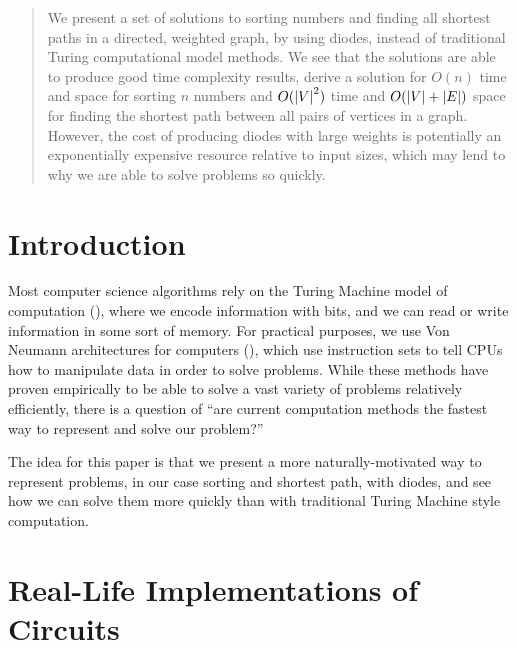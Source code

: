\documentclass{article}
\begin{document}
\maketitle

\begin{abstract}
  We present a set of solutions to sorting numbers and finding all shortest paths in a directed, weighted graph, by using diodes, instead of traditional Turing computational model methods.
  We see that the solutions are able to produce good time complexity results,
  derive a solution for $O(n)$ time and space for sorting $n$ numbers and $O(\abs{V}^2)$ time and $O(\abs{V} + \abs{E})$ space for finding the shortest path between all pairs of vertices in a graph.
  However, the cost of producing diodes with large weights is potentially an exponentially expensive resource relative to input sizes, which may lend to why we are able to solve problems so quickly.
\end{abstract}




\section{Introduction}

Most computer science algorithms rely on the Turing Machine model of computation (\cite{turing1936computable}), where we encode information with bits, and we can read or write information in some sort of memory.
For practical purposes, we use Von Neumann architectures for computers (\cite{von_nuemann_architecture}), which use instruction sets to tell CPUs how to manipulate data in order to solve problems.
While these methods have proven empirically to be able to solve a vast variety of problems relatively efficiently, there is a question of ``are current computation methods the fastest way to represent and solve our problem?''

The idea for this paper is that we present a more naturally-motivated way to represent problems, in our case sorting and shortest path, with diodes, and see how we can solve them more quickly than with traditional Turing Machine style computation.




\section{Real-Life Implementations of Circuits}
\label{sec:real_life}
\end{document}

